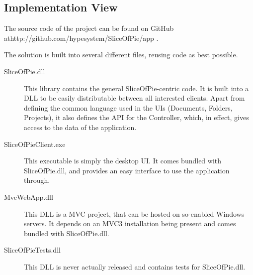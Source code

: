 \subsection{Implementation View}
\label{sec:implementationview}

The source code of the project can be found on GitHub at\newline http://github.com/hypesystem/SliceOfPie/app .

The solution is built into several different files, reusing code as best possible.

\begin{description}
    \item[SliceOfPie.dll] This library contains the general SliceOfPie-centric code. It is built into a
        DLL to be easily distributable between all interested clients. Apart from defining the common
        language used in the UIs (Documents, Folders, Projects), it also defines the API for the
        Controller, which, in effect, gives access to the data of the application.
    \item[SliceOfPieClient.exe] This executable is simply the desktop UI. It comes bundled with
        SliceOfPie.dll, and provides an easy interface to use the application through.
    \item[MvcWebApp.dll] This DLL is a MVC project, that can be hosted on so-enabled Windows servers.
        It depends on an MVC3 installation being present and comes bundled with SliceOfPie.dll.
    \item[SliceOfPieTests.dll] This DLL is never actually released and contains tests for SliceOfPie.dll.
\end{description}
